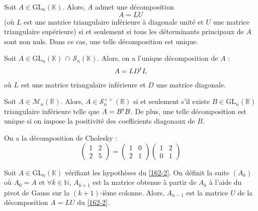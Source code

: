   \begin{theorem}
    \label{162-2}
    Soit $A \in \mathrm{GL}_n(\mathbb{K})$. Alors, $A$ admet une décomposition
    \[ A = LU \]
    (où $L$ est une matrice triangulaire inférieure à diagonale unité et $U$ une matrice triangulaire supérieure) si et seulement si tous les déterminants principaux de $A$ sont non nuls. Dans ce cas, une telle décomposition est unique.
  \end{theorem}

  \begin{corollary}
    Soit $A \in \mathrm{GL}_n(\mathbb{K}) \, \cap \, \mathcal{S}_n(\mathbb{K})$. Alors, on a l'unique décomposition de $A$ :
    \[ A = LD\mathstrut ^t L \]
    où $L$ est une matrice triangulaire inférieure et $D$ une matrice diagonale.
  \end{corollary}

  \begin{application}
    Soit $A \in \mathcal{M}_n(\mathbb{R})$. Alors, $A \in \mathcal{S}_n^{++}(\mathbb{R})$ si et seulement s'il existe $B \in \mathrm{GL}_n(\mathbb{R})$ triangulaire inférieure telle que $A = B\mathstrut ^t B$. De plus, une telle décomposition est unique si on impose la positivité des coefficients diagonaux de $B$.
  \end{application}


  \begin{example}
    On a la décomposition de Cholesky :
    \[ \begin{pmatrix} 1 & 2 \\ 2 & 5 \end{pmatrix} = \begin{pmatrix} 1 & 0 \\ 2 & 1 \end{pmatrix} \begin{pmatrix} 1 & 2 \\ 0 & 1 \end{pmatrix} \]
  \end{example}


  \begin{proposition}
    Soit $A \in \mathrm{GL}_n(\mathbb{K})$ vérifiant les hypothèses du \cref{162-2}. On définit la suite $(A_k)$ où $A_0 = A$ et $\forall k \in \mathbb{N}$, $A_{k+1}$ est la matrice obtenue à partir de $A_k$ à l'aide du pivot de Gauss sur la $(k+1)$-ième colonne. Alors, $A_{n-1}$ est la matrice $U$ de la décomposition $A = LU$ du \cref{162-2}.
  \end{proposition}

